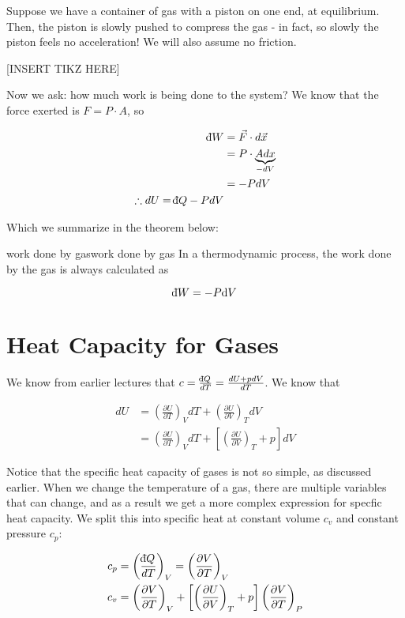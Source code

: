     Suppose we have a container of gas with a piston on one end, at equilibrium. Then, the piston is slowly pushed to compress the gas - in fact, so slowly the piston feels no acceleration! We will also assume no friction.

    [INSERT TIKZ HERE]


    Now we ask: how much work is being done to the system? We know that the force exerted is $F = P \cdot A$, so

    \begin{align*}
      \db W &= \vec F \cdot d\vec{x}\\
      &= P \cdot \underbrace{A dx}_{-dV}\\
      &= -P dV\\
      \therefore dU = \db Q - P dV
    \end{align*}

    Which we summarize in the theorem below: 

    \begin{theorem}{work done by gas}{work done by gas}
      In a thermodynamic process, the work done by the gas is always calculated as 

      \[ \db W = -P \dd V\]
    \end{theorem}


    \section{Heat Capacity for Gases}

    We know from earlier lectures that $c = \frac{\db Q}{dT} = \frac{dU + p dV}{dT}$. We know that

    \begin{align*}
      dU &= \left(\frac{\partial U}{\partial T}\right)_V dT + \left(\frac{\partial U}{\partial V}\right)_T dV\\
      &= \left(\frac{\partial U}{\partial T}\right)_V dT + \left[ \left( \frac{\partial U}{\partial V}\right)_T + p\right] dV
    \end{align*}

    Notice that the specific heat capacity of gases is not so simple, as discussed earlier. When we change the temperature of a gas, there are multiple variables that can change, and as a result we get a more complex expression for specfic heat capacity. We split this into specific heat at constant volume $c_v$ and constant pressure $c_p$:

    \begin{align*}
        c_p &= \left(\frac{\db Q}{dT}\right)_V = \left(\frac{\partial V}{\partial T}\right)_V\\
        c_v &= \left(\frac{\partial V}{\partial T}\right)_V + \left[\left(\frac{\partial U}{\partial V}\right)_T + p \right]\left(\frac{\partial V}{\partial T}\right)_P
    \end{align*}


